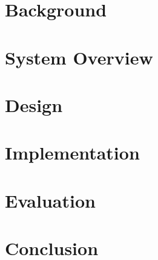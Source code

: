 \documentclass[nonacm,sigplan]{acmart}
\begin{document}
\section{Background}


\section{System Overview}


\section{Design}


\section{Implementation}


\section{Evaluation}





\section{Conclusion}







\end{document}
